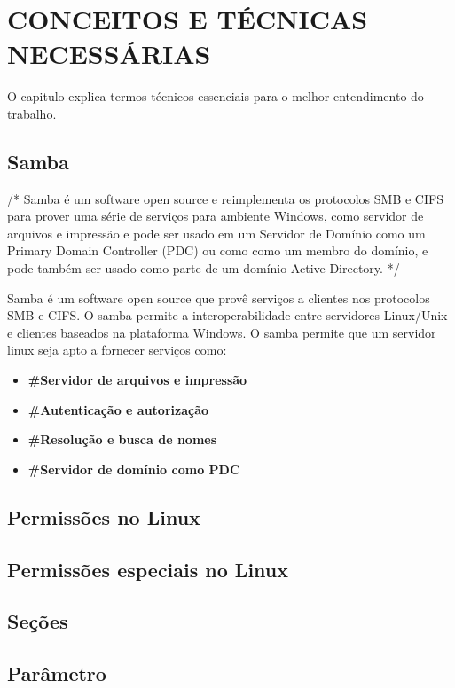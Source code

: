 \chapter{CONCEITOS E TÉCNICAS NECESSÁRIAS}

O capitulo explica termos técnicos essenciais para o melhor entendimento do trabalho.

\section{Samba}

/* Samba é um software open source e reimplementa os protocolos SMB e CIFS para prover
uma série de serviços para ambiente Windows, como servidor de arquivos e impressão e pode
ser usado em um Servidor de Domínio como um Primary Domain Controller (PDC) ou como
como um membro do domínio, e pode também ser usado como parte de um domínio Active
Directory. */

Samba é um software open source que provê serviços a clientes nos protocolos SMB e CIFS.
O samba permite a interoperabilidade entre servidores Linux/Unix e clientes baseados na
plataforma Windows.
O samba permite que um servidor linux seja apto a fornecer serviços como:
  \begin{itemize}
    \item \textbf{\#Servidor de arquivos e impressão}
    \item \textbf{\#Autenticação e autorização}
    \item \textbf{\#Resolução e busca de nomes}
    \item \textbf{\#Servidor de domínio como PDC}
  \end{itemize}

\section{Permissões no Linux}

\section{Permissões especiais no Linux}

\section{Seções}

\section{Parâmetro}

